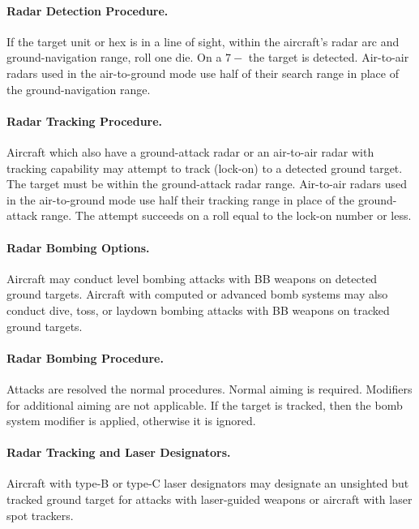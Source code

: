 \begin{advancedrules}
{\paragraph{Radar Detection Procedure.} If the target unit or hex is in a line of sight, within the aircraft's radar arc and ground-navigation range, roll one die. On a $7-$ the target is detected. Air-to-air radars used in the air-to-ground mode use half of their search range in place of the ground-navigation range.

\paragraph{Radar Tracking Procedure.} Aircraft which also have a ground-attack radar or an air-to-air radar with tracking capability may attempt to track (lock-on) to a detected ground target. The target must be within the ground-attack radar range. Air-to-air radars used in the air-to-ground mode use half their tracking range in place of the ground-attack range. The attempt succeeds on a roll equal to the lock-on number or less.

\paragraph{Radar Bombing Options.} Aircraft may conduct level bombing attacks with BB weapons on detected ground targets. Aircraft with computed or advanced bomb systems may also conduct dive, toss, or laydown bombing attacks with BB weapons on tracked ground targets.

\paragraph{Radar Bombing Procedure.} Attacks are resolved the normal procedures. Normal aiming is required. Modifiers for additional aiming are not applicable. If the target is tracked, then the bomb system modifier is applied, otherwise it is ignored. 

\paragraph{Radar Tracking and Laser Designators.} Aircraft with type-B or type-C laser designators may designate an unsighted but tracked ground target for attacks with laser-guided weapons or aircraft with laser spot trackers.


}



\end{advancedrules}
